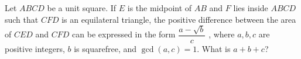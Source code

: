 Let $ABCD$ be a unit square. If $E$ is the midpoint of $AB$ and $F$ lies inside $ABCD$ such that $CFD$ is an equilateral triangle, the positive difference between the area of $CED$ and $CFD$ can be expressed in the form $\dfrac{a-\sqrt{b}}{c}$ , where $a,b,c$ are positive integers, $b$ is squarefree, and $\gcd(a,c)=1$. What is $a + b + c$?
